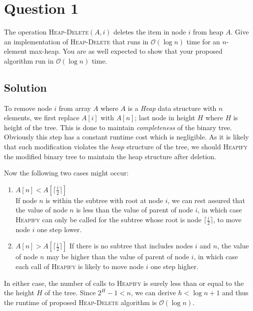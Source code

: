 
\section*{Question 1}
The operation \textsc{Heap-Delete}$(A,i)$ deletes the item in node $i$ from heap $A$. Give an implementation of \textsc{Heap-Delete} that runs in $\mathcal{O}(\log n)$ time for an $n$-element max-heap. You are as well expected to show that your proposed algorithm run in $\mathcal{O}(\log n)$ time.

\subsection*{Solution}

To remove node $i$ from array $A$ where $A$ is a \textit{Heap} data structure with $n$ elements, we first replace $A[i]$ with $A[n]$; last node in height $H$ where $H$ is height of the tree. This is done to maintain \textit{completeness} of the binary tree. Obviously this step has a constant runtime cost which is negligible. As it is likely that such modification violates the \textit{heap} structure of the tree, we should \textsc{Heapify} the modified binary tree to maintain the heap structure after deletion.

Now the following two cases might occur:

\begin{enumerate}[label=(\alph*)]
\item $A[n] < A[\lceil \frac{i}{2} \rceil ] $\\
If node $n$ is within the subtree with root at node $i$, we can rest assured that the value of node $n$ is less than the value of parent of node $i$, in which case \textsc{Heapify} can only be called for the subtree whose root is node $\lceil \frac{i}{2} \rceil$, to move node $i$ one step lower.

\item $A[n] > A[\lceil \frac{i}{2} \rceil ] $
If there is no subtree that includes nodes $i$ and $n$, the value of node $n$ may be higher than the value of parent of node $i$, in which case each call of \textsc{Heapify} is likely to move node $i$ one step higher.
\end{enumerate}

In either case, the number of calls to \textsc{Heapify} is surely less than or equal to the the height $H$ of the tree. Since $ 2^{H} - 1 < n $, we can derive $ h < \log {n+1} $ and thus the runtime of proposed \textsc{Heap-Delete} algorithm is $\mathcal{O}(\log n)$.
